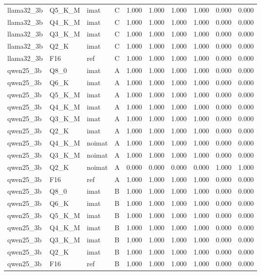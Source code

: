 \begin{tabular}{llllrrrrrr}
llama32\_3b & Q5\_K\_M & imat & C & 1.000 & 1.000 & 1.000 & 1.000 & 0.000 & 0.000 \\
llama32\_3b & Q4\_K\_M & imat & C & 1.000 & 1.000 & 1.000 & 1.000 & 0.000 & 0.000 \\
llama32\_3b & Q3\_K\_M & imat & C & 1.000 & 1.000 & 1.000 & 1.000 & 0.000 & 0.000 \\
llama32\_3b & Q2\_K & imat & C & 1.000 & 1.000 & 1.000 & 1.000 & 0.000 & 0.000 \\
llama32\_3b & F16 & ref & C & 1.000 & 1.000 & 1.000 & 1.000 & 0.000 & 0.000 \\
qwen25\_3b & Q8\_0 & imat & A & 1.000 & 1.000 & 1.000 & 1.000 & 0.000 & 0.000 \\
qwen25\_3b & Q6\_K & imat & A & 1.000 & 1.000 & 1.000 & 1.000 & 0.000 & 0.000 \\
qwen25\_3b & Q5\_K\_M & imat & A & 1.000 & 1.000 & 1.000 & 1.000 & 0.000 & 0.000 \\
qwen25\_3b & Q4\_K\_M & imat & A & 1.000 & 1.000 & 1.000 & 1.000 & 0.000 & 0.000 \\
qwen25\_3b & Q3\_K\_M & imat & A & 1.000 & 1.000 & 1.000 & 1.000 & 0.000 & 0.000 \\
qwen25\_3b & Q2\_K & imat & A & 1.000 & 1.000 & 1.000 & 1.000 & 0.000 & 0.000 \\
qwen25\_3b & Q4\_K\_M & noimat & A & 1.000 & 1.000 & 1.000 & 1.000 & 0.000 & 0.000 \\
qwen25\_3b & Q3\_K\_M & noimat & A & 1.000 & 1.000 & 1.000 & 1.000 & 0.000 & 0.000 \\
qwen25\_3b & Q2\_K & noimat & A & 0.000 & 0.000 & 0.000 & 0.000 & 1.000 & 1.000 \\
qwen25\_3b & F16 & ref & A & 1.000 & 1.000 & 1.000 & 1.000 & 0.000 & 0.000 \\
qwen25\_3b & Q8\_0 & imat & B & 1.000 & 1.000 & 1.000 & 1.000 & 0.000 & 0.000 \\
qwen25\_3b & Q6\_K & imat & B & 1.000 & 1.000 & 1.000 & 1.000 & 0.000 & 0.000 \\
qwen25\_3b & Q5\_K\_M & imat & B & 1.000 & 1.000 & 1.000 & 1.000 & 0.000 & 0.000 \\
qwen25\_3b & Q4\_K\_M & imat & B & 1.000 & 1.000 & 1.000 & 1.000 & 0.000 & 0.000 \\
qwen25\_3b & Q3\_K\_M & imat & B & 1.000 & 1.000 & 1.000 & 1.000 & 0.000 & 0.000 \\
qwen25\_3b & Q2\_K & imat & B & 1.000 & 1.000 & 1.000 & 1.000 & 0.000 & 0.000 \\
qwen25\_3b & F16 & ref & B & 1.000 & 1.000 & 1.000 & 1.000 & 0.000 & 0.000 \\

\end{tabular}
